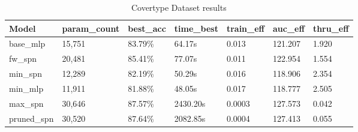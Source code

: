 \begin{table}[h!]
    \centering
    \begin{tabular}{|l|l|l|l|l|l|l|}
    \hline
    \textbf{Model} & \textbf{param\_count} & \textbf{best\_acc} & \textbf{time\_best} & \textbf{train\_eff} & \textbf{auc\_eff} & \textbf{thru\_eff} \\
    \hline
    base\_mlp & 15,751 & 83.79\% & 64.17s & 0.013 & 121.207 & 1.920 \\
    fw\_spn & 20,481 & 85.41\% & 77.07s & 0.011 & 122.954 & 1.554 \\
    min\_spn & 12,289 & 82.19\% & 50.29s & 0.016 & 118.906 & 2.354 \\
    min\_mlp & 11,911 & \cellcolor{red!25}81.88\% & \cellcolor{green!25}48.05s & \cellcolor{green!25}0.017 & \cellcolor{red!25}118.777 & \cellcolor{green!25}2.505 \\
    max\_spn & 30,646 & 87.57\% & \cellcolor{red!25}2430.20s & \cellcolor{red!25}0.0003 & \cellcolor{green!25}127.573 & \cellcolor{red!25}0.042 \\
    pruned\_spn & 30,520 & \cellcolor{green!25}87.64\% & 2082.85s & 0.0004 & 127.413 & 0.055 \\
    \hline
    \end{tabular}
    \caption{Covertype Dataset results}
    \label{tab:covertypeResults}
\end{table}

